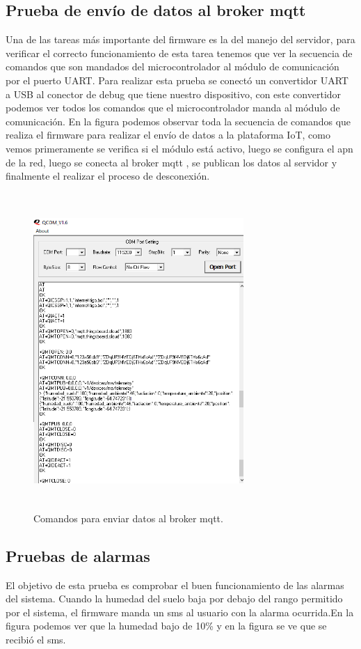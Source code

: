 \subsection{Prueba de envío de datos al broker mqtt}
Una de las tareas más importante del firmware es la del manejo del servidor, para verificar el correcto funcionamiento de esta tarea tenemos que ver la secuencia de comandos que son mandados del microcontrolador al módulo de comunicación por el puerto UART.
Para realizar esta prueba se conectó un convertidor UART a USB al conector de debug que tiene nuestro dispositivo, con este convertidor podemos ver todos los comandos que el microcontrolador manda al módulo de comunicación.
En la figura podemos observar toda la secuencia de comandos que realiza el firmware para realizar el envío de datos a la plataforma IoT, como vemos  primeramente se verifica si el módulo está activo, luego se configura el apn de la red, luego se conecta al broker mqtt , se publican  los datos al servidor y finalmente el realizar el proceso de desconexión.

\begin{figure}[h]
  \centering
    \includegraphics[width=8cm, height=12cm]{./Figures/Qcom_enviodedatos.png}
  \caption{Comandos para enviar datos al broker mqtt.}
    \label{fig:conexion broker}
\end{figure}

\subsection{Pruebas de alarmas}
El objetivo de esta prueba es comprobar el buen funcionamiento de las alarmas del sistema.
Cuando la humedad del suelo baja por debajo del rango permitido por el sistema, el firmware manda un sms al usuario con la alarma ocurrida.En la figura podemos ver que la humedad bajo de 10\% y en la figura se ve que se recibió el sms.

